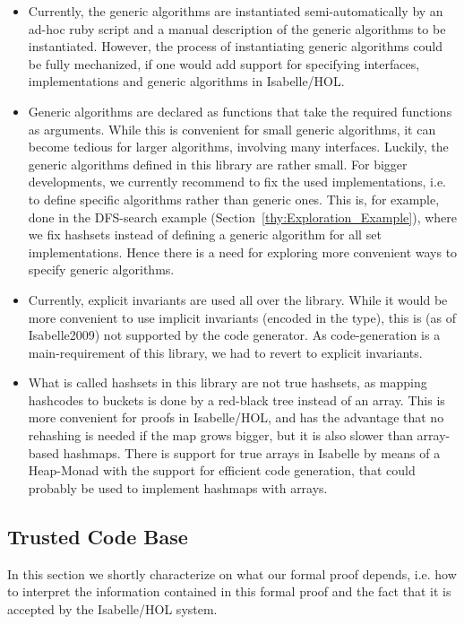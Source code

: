 \begin{itemize}
  \item Currently, the generic algorithms are instantiated semi-automatically by an ad-hoc ruby script and a
  manual description of the generic algorithms to be instantiated. However, the process of instantiating
  generic algorithms could be fully mechanized, if one would add support for specifying interfaces, 
  implementations and generic algorithms in Isabelle/HOL. 
  
  \item Generic algorithms are declared as functions that take the required functions as arguments.
  While this is convenient for small generic algorithms, it can become tedious for larger algorithms,
  involving many interfaces. 
  Luckily, the generic algorithms defined in this library are rather small. For bigger developments, we currently recommend to
  fix the used implementations, i.e. to define specific algorithms rather than generic ones. This is, for example, done in the 
  DFS-search example (Section~\ref{thy:Exploration_Example}), where we fix hashsets instead of defining a generic algorithm for
  all set implementations. Hence there is a need for exploring more convenient ways to specify generic algorithms.
  
  \item Currently, explicit invariants are used all over the library. While it would be more convenient to use implicit invariants (encoded in the type), this
  is (as of Isabelle2009) not supported by the code generator. As code-generation is a main-requirement of this library, we had to revert to explicit invariants.

  \item What is called hashsets in this library are not true hashsets, as mapping hashcodes to buckets is done by a red-black tree instead
      of an array. This is more convenient for proofs in Isabelle/HOL, and has the advantage that no rehashing is needed if the map grows bigger, but it is also slower than array-based hashmaps. There is support for true arrays in Isabelle by means of a Heap-Monad \cite{BKHEM08} with the support for efficient code generation, that could probably be used to implement hashmaps with arrays.
\end{itemize}

\subsection {Trusted Code Base}
  In this section we shortly characterize on what our formal proof depends, i.e. how to interpret the information contained in this formal proof and the fact that it
  is accepted by the Isabelle/HOL system.


